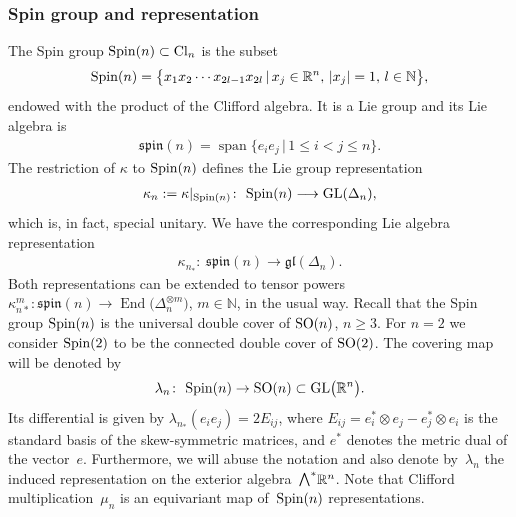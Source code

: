 \documentclass[pdftex]{sigma}
\newcommand{\ext}{\raise1pt\hbox{\small$\bigwedge$}}
\newcommand{\lra}{\longrightarrow}
\numberwithin{equation}{section}
\begin{document}
\subsubsection{Spin group and representation}
The Spin group ${\rm Spin}(n)\subset {\rm Cl}_n$ is the subset
\begin{gather*} {\rm Spin}(n) =\big\{x_1x_2\cdots x_{2l-1}x_{2l} \,|\, x_j\in\mathbb{R}^n, \, |x_j|=1,\,l\in\mathbb{N}\big\},\end{gather*}
endowed with the product of the Clifford algebra. It is a Lie group and its Lie algebra is
\begin{gather*} \mathfrak{spin}(n)=\operatorname{span} \{e_ie_j\, | \,1\leq i< j \leq n\}.\end{gather*}
The restriction of $\kappa$ to ${\rm Spin}(n)$ defines the Lie group representation
\begin{gather*} \kappa_n:=\kappa|_{{\rm Spin}(n)}\colon \ {\rm Spin}(n)\lra {\rm GL}(\Delta_n),\end{gather*}
which is, in fact, special unitary. We have the corresponding Lie algebra representation
\begin{gather*} \kappa_{n_*}\colon \ \mathfrak{spin}(n)\lra \mathfrak{gl}(\Delta_n).\end{gather*}
Both representations can be extended to tensor powers $\kappa_{n*}^m\colon \mathfrak{spin}(n)\longrightarrow \operatorname{End}\big(\Delta_n^{\otimes m}\big)$, $m\in \mathbb{N}$, in the usual way. Recall that the Spin group ${\rm Spin}(n)$ is the universal double cover of ${\rm SO}(n)$, $n\ge 3$. For $n=2$ we consider ${\rm Spin}(2)$ to be the connected double cover of ${\rm SO}(2)$. The covering map will be denoted by
\begin{gather*} \lambda_n\colon \ {\rm Spin}(n)\rightarrow {\rm SO}(n)\subset {\rm GL}\big(\mathbb{R}^n\big).\end{gather*}
Its differential is given
by $\lambda_{n_*}(e_ie_j) = 2E_{ij}$, where $E_{ij}=e_i^*\otimes e_j - e_j^*\otimes e_i$ is the standard basis of the skew-symmetric matrices, and $e^*$ denotes the metric dual of the vector~$e$. Furthermore, we will abuse the notation and also denote by~$\lambda_n$ the induced representation on the exterior algebra~$\ext^*\mathbb{R}^n$.
Note that Clifford multiplication~$\mu_n$ is an equivariant map of~${\rm Spin}(n)$ representations.
\end{document}
